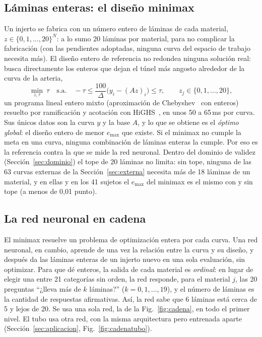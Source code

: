 \subsection{Láminas enteras: el diseño minimax}\label{sec:minimax}
Un injerto se fabrica con un número entero de láminas de cada material, $z\in\{0,1,\ldots,20\}^N$: a lo sumo 20 láminas por material, para no complicar la fabricación (con las pendientes adoptadas, ninguna curva del espacio de trabajo necesita más). El diseño entero de referencia no redondea ninguna solución real: busca directamente los enteros que dejan el túnel más angosto alrededor de la curva de la arteria,
\[
\min_{z,\tau}\ \tau\quad\text{s.a.}\quad -\tau\le\frac{100}{\Delta}\bigl(y_i-(Az)_i\bigr)\le\tau,\qquad z_j\in\{0,1,\ldots,20\},
\]
un programa lineal entero mixto (aproximación de Chebyshev~\cite{cheney} con enteros) resuelto por ramificación y acotación con HiGHS~\cite{highs}, en unos 50 a 65\,ms por curva. Sus únicos datos son la curva $y$ y la base $A$, y lo que se obtiene es el \emph{óptimo global}: el diseño entero de menor $e_{\max}$ que existe. Si el minimax no cumple la meta en una curva, ninguna combinación de láminas enteras la cumple. Por eso es la referencia contra la que se mide la red neuronal. Dentro del dominio de validez (Sección~\ref{sec:dominio}) el tope de 20 láminas no limita: sin tope, ninguna de las 63 curvas externas de la Sección~\ref{sec:externa} necesita más de 18 láminas de un material, y en ellas y en los 41 sujetos el $e_{\max}$ del minimax es el mismo con y sin tope (a menos de 0,01 punto).

\subsection{La red neuronal en cadena}\label{sec:enteros}
El minimax resuelve un problema de optimización entera por cada curva. Una red neuronal, en cambio, aprende de una vez la relación entre la curva y su diseño, y después da las láminas enteras de un injerto nuevo en una sola evaluación, sin optimizar. Para que dé enteros, la salida de cada material es \emph{ordinal}: en lugar de elegir una entre 21 categorías sin orden, la red responde, para el material $j$, las 20 preguntas ``¿lleva más de $k$ láminas?'' ($k=0,1,\ldots,19$), y el número de láminas es la cantidad de respuestas afirmativas. Así, la red sabe que 6 láminas está cerca de 5 y lejos de 20. Se usa una sola red, la de la Fig.~\ref{fig:cadena}, en todo el primer nivel. El tubo usa otra red, con la misma arquitectura pero entrenada aparte (Sección~\ref{sec:aplicacion}, Fig.~\ref{fig:cadenatubo}).

